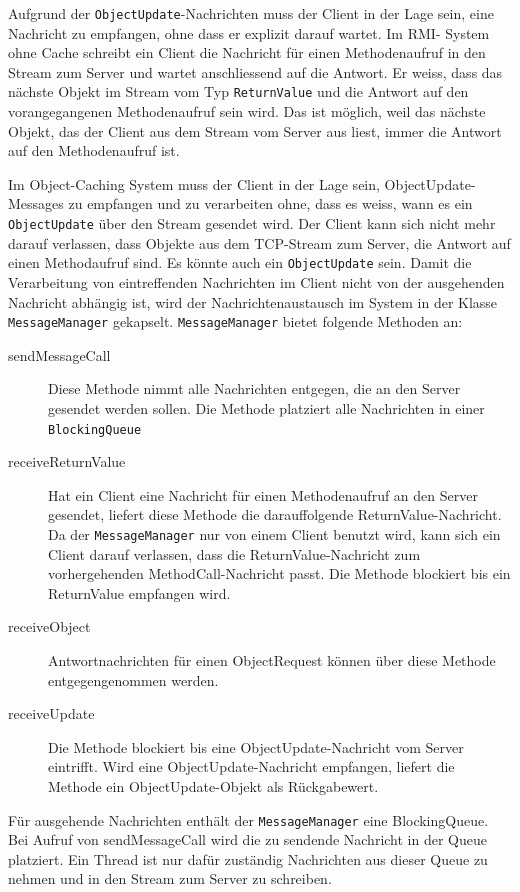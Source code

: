 Aufgrund der \verb|ObjectUpdate|-Nachrichten muss der Client in der Lage sein, eine Nachricht zu empfangen, ohne dass er explizit darauf wartet. Im RMI- System ohne Cache schreibt ein Client die Nachricht für einen Methodenaufruf in den Stream zum Server und wartet anschliessend auf die Antwort. Er weiss, dass das nächste Objekt im Stream vom Typ \texttt{ReturnValue} und die Antwort auf den vorangegangenen Methodenaufruf sein wird. Das ist möglich, weil das nächste Objekt, das der Client aus dem Stream vom Server aus liest, immer die Antwort auf den Methodenaufruf ist.

Im Object-Caching System muss der Client in der Lage sein, Object\-Update\--Messages zu empfangen und zu verarbeiten ohne, dass es weiss, wann es ein \verb|ObjectUpdate| über den Stream gesendet wird. Der Client kann sich nicht mehr darauf verlassen, dass Objekte aus dem TCP-Stream zum Server, die Antwort auf einen Methodaufruf sind. Es könnte auch ein \texttt{ObjectUpdate} sein. Damit die Verarbeitung von eintreffenden Nach\-richten im Client nicht von der ausgehenden Nachricht abhängig ist, wird der Nach\-richt\-enaustausch im System in der Klasse \verb|MessageManager| gekapselt. \texttt{MessageManager} bietet folgende Methoden an:

\begin{description}
\item[sendMessageCall] Diese Methode nimmt alle Nachrichten entgegen, die an den Server gesendet werden sollen. Die Methode platziert alle Nachrichten in einer \verb|BlockingQueue| 
\item[receiveReturnValue] Hat ein Client eine Nachricht für einen Methodenaufruf an den Server gesendet, liefert diese Methode die darauffolgende ReturnValue-Nachricht. Da der \verb+MessageManager+ nur von einem Client benutzt wird, kann sich ein Client darauf verlassen, dass die ReturnValue-Nachricht zum vorhergehenden MethodCall-Nach\-richt passt. Die Methode blockiert bis ein ReturnValue empfangen wird.
\item[receiveObject] Antwortnachrichten für einen ObjectRequest können über diese Methode entgegengenommen werden. 
\item[receiveUpdate] Die Methode blockiert bis eine ObjectUpdate-Nachricht vom Server eintrifft. Wird eine ObjectUpdate-Nachricht empfangen, liefert die Methode ein ObjectUpdate-Objekt als Rückgabewert.
\end{description}

Für ausgehende Nachrichten enthält der \verb|MessageManager| eine BlockingQueue. Bei Aufruf von sendMessageCall wird die zu sendende Nachricht in der Queue platziert. Ein Thread ist nur dafür zuständig Nachrichten aus dieser Queue zu nehmen und in den Stream zum Server zu schreiben.



